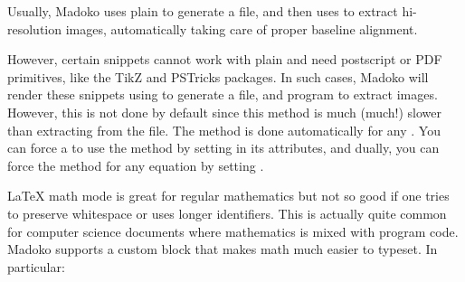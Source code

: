 \documentclass{book}
\begin{document}
\begin{mdP}[class={indent},data-line={1628}]%
{}Usually, Madoko uses plain %
{}%
{} to generate a %
{}%
{} file, and then
uses %
{}%
{} to extract hi-resolution images, automatically taking care
of proper baseline alignment.%
\end{mdP}%
\begin{mdP}[class={indent},data-line={1632}]%
{}However, certain snippets cannot work with plain %
{}%
{} and need postscript
or PDF primitives, like the TikZ and PSTricks packages. In such cases,
Madoko will render these snippets using %
{}%
{} to generate a %
{}%
{}
file, and%
{}{\mdNbsp}%
{} program to extract images. However, this
is not done by default since this method is much (much!) slower than extracting
from the %
{}%
{} file. The %
{}%
{} method is done automatically for any %
{}%
{}.
You can force a %
{}%
{} to use the %
{}%
{} method by setting %
{}%
{}
in its attributes, and dually, you can force the %
{}%
{} method for any
equation by setting %
{}%
{}.%
\end{mdP}%
\begin{mdP}[class={para-continue},data-line={1653}]%
{}LaTeX math mode is great for regular mathematics but not so good if one tries
to preserve whitespace or uses longer identifiers. This is actually quite common
for computer science documents where mathematics is mixed with program code.
Madoko supports a %
{}%
{} custom block that makes %
{}%
{} math much
easier to typeset. In particular:%
\end{mdP}%
\end{document}

